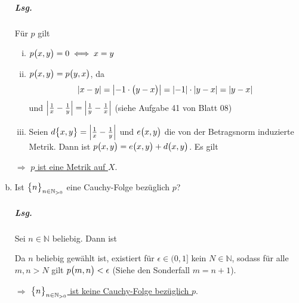 \documentclass{scrreprt}
\begin{document}
\begin{enumerate}[(a)]
  \subparagraph{Lsg.} Für $p$ gilt
  \begin{enumerate}[(i)]
  \item $p\qty\big(x, y) = 0 \iff x = y$
  \item $p\qty\big(x, y) = p\qty\big(y, x)$, da
    \[
      \abs{x - y} = \abs{-1 \cdot \qty\big(y - x)} =
      \abs{-1} \cdot \abs{y - x} = \abs{y - x}
    \]
    und $\abs{\frac{1}{x} - \frac{1}{y}} = \abs{\frac{1}{y} - \frac{1}{x}}$
    (siehe Aufgabe 41 von Blatt 08)
  \item Seien $d\qty\big{x, y} = \abs{\frac{1}{x} - \frac{1}{y}}$ und
    $e\qty\big(x, y)$ die von der Betragsnorm induzierte Metrik.
    Dann ist $p\qty\big(x, y) = e\qty\big(x, y) + d\qty\big(x, y)$.
    Es gilt
  \end{enumerate}

  $\Rightarrow$ \underline{$p$ ist eine Metrik auf $X$}.

\item Ist $\qty\big{n}_{n \in \mathbb{N}_{> 0}}$ eine Cauchy-Folge bezüglich $p$?

  \subparagraph{Lsg.} Sei $n \in \mathbb{N}$ beliebig.
  Dann ist

  Da $n$ beliebig gewählt ist, existiert für $\epsilon \in \big(0, 1\big]$ kein
  $N \in \mathbb{N}$, sodass für alle $m, n > N$ gilt
  $p\qty\big(m, n) < \epsilon$ (Siehe den Sonderfall $m = n + 1$).

  $\Rightarrow$ \underline{$\qty\big{n}_{n \in \mathbb{N}_{> 0}}$ ist keine
  Cauchy-Folge bezüglich $p$}.
\end{enumerate}
\end{document}
